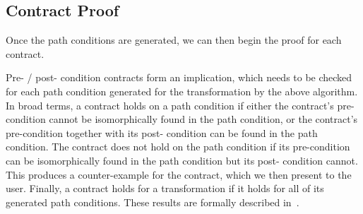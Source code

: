\subsection{Contract Proof}

Once the path conditions are generated, we can then begin the proof for each contract.

Pre- / post- condition contracts form an implication, which
needs to be checked for each path condition generated for
the transformation by the above algorithm. In broad terms,
a contract holds on a path condition if either the contract’s
pre-condition cannot be isomorphically found in the path
condition, or the contract’s pre-condition together with its post-
condition can be found in the path condition. The contract
does not hold on the path condition if its pre-condition can
be isomorphically found in the path condition but its post-
condition cannot. This produces a counter-example for the contract, which we then present to the user. Finally, a contract holds for a transformation if it holds for all of its generated path conditions. These results
are formally described in~\cite{Lucio2014}.







